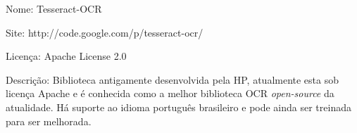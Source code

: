 \begin{description*}
    \item[Nome:] Tesseract-OCR
    \item[Site:] http://code.google.com/p/tesseract-ocr/
    \item[Licença:] Apache License 2.0
    \item[Descrição:] Biblioteca antigamente desenvolvida pela HP, atualmente esta sob licença Apache e é conhecida como a melhor biblioteca OCR {\it open-source} da atualidade. Há suporte ao idioma português brasileiro e pode ainda ser treinada para ser melhorada.
\end{description*}



